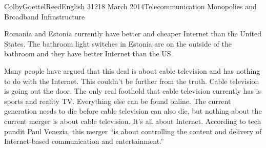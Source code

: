 \documentclass[12pt]{article}
\begin{document}
\begin{mla}{Colby}{Goettel}{Reed}{English 312}{18 March 2014}{Telecommunication Monopolies and Broadband Infrastructure}
\begin{figure}
\end{figure}

Romania and Estonia currently have better and cheaper Internet than the United States. The bathroom light switches in Estonia are on the outside of the bathroom and they have better Internet than the US.



Many people have argued that this deal is about cable television and has nothing to do with the Internet. This couldn't be further from the truth. Cable television is going out the door. The only real foothold that cable television currently has is sports and reality TV. Everything else can be found online. The current generation needs to die before cable television can also die, but nothing about the current merger is about cable television. It's all about Internet. According to tech pundit Paul Venezia, this merger ``is about controlling the content and delivery of Internet-based communication and entertainment.''


\end{mla}
\end{document}
